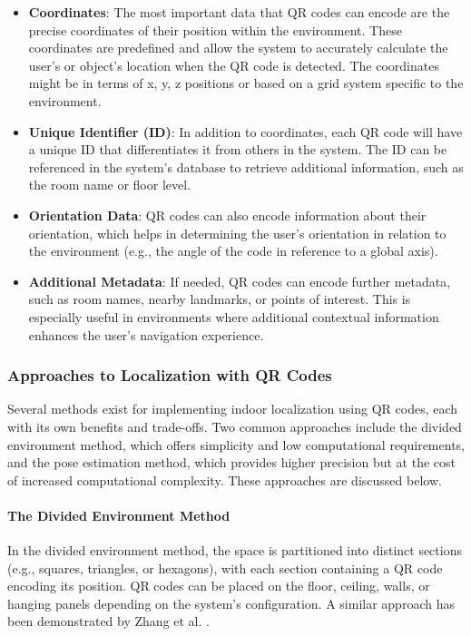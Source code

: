 \begin{itemize}
	\item \textbf{Coordinates}: The most important data that QR codes can encode are the precise coordinates of their position within the environment. These coordinates are predefined and allow the system to accurately calculate the user’s or object’s location when the QR code is detected. The coordinates might be in terms of x, y, z positions or based on a grid system specific to the environment.
	
	\item \textbf{Unique Identifier (ID)}: In addition to coordinates, each QR code will have a unique ID that differentiates it from others in the system. The ID can be referenced in the system’s database to retrieve additional information, such as the room name or floor level.
	
	\item \textbf{Orientation Data}: QR codes can also encode information about their orientation, which helps in determining the user’s orientation in relation to the environment (e.g., the angle of the code in reference to a global axis).
	
	\item \textbf{Additional Metadata}: If needed, QR codes can encode further metadata, such as room names, nearby landmarks, or points of interest. This is especially useful in environments where additional contextual information enhances the user’s navigation experience.
\end{itemize}

\subsubsection{Approaches to Localization with QR Codes}

Several methods exist for implementing indoor localization using QR codes, each with its own benefits and trade-offs. Two common approaches include the divided environment method, which offers simplicity and low computational requirements, and the pose estimation method, which provides higher precision but at the cost of increased computational complexity. These approaches are discussed below.

\paragraph{The Divided Environment Method}

In the divided environment method, the space is partitioned into distinct sections (e.g., squares, triangles, or hexagons), with each section containing a QR code encoding its position. QR codes can be placed on the floor, ceiling, walls, or hanging panels depending on the system's configuration. A similar approach has been demonstrated by Zhang et al. \cite{zhang2015}.

